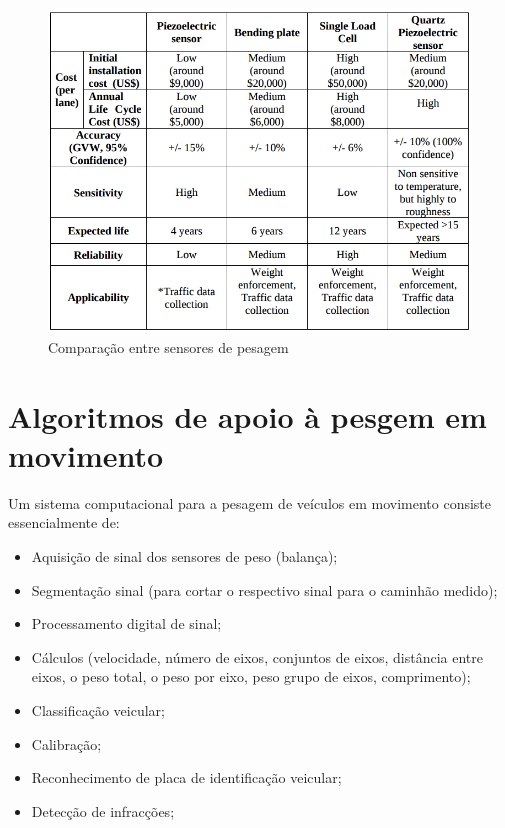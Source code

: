 \documentclass{ufscThesis}
\begin{document}
\begin{figure}[h!]
  \caption{Comparação entre sensores de pesagem \cite{ref:zhang2007evaluating}}
  \label{fig:tabela-comparacao-sensores}
  \centering
    \includegraphics[scale=0.4]{./figuras/tabela-comparacao-siwim.png}
\end{figure}


\chapter{Algoritmos de apoio à pesgem em movimento}\label{algoritmos}
Um sistema computacional para a pesagem de veículos em movimento consiste essencialmente de:

\begin{itemize}
\item Aquisição de sinal dos sensores de peso (balança);
\item Segmentação sinal (para cortar o respectivo sinal para o caminhão medido);
\item Processamento digital de sinal;
\item Cálculos (velocidade, número de eixos, conjuntos de eixos, distância entre eixos, o peso total, o peso por eixo, peso grupo de eixos, comprimento);
\item Classificação veicular;
\item Calibração;
\item Reconhecimento de placa de identificação veicular;
\item Detecção de infracções;
\end{itemize}
\end{document}
